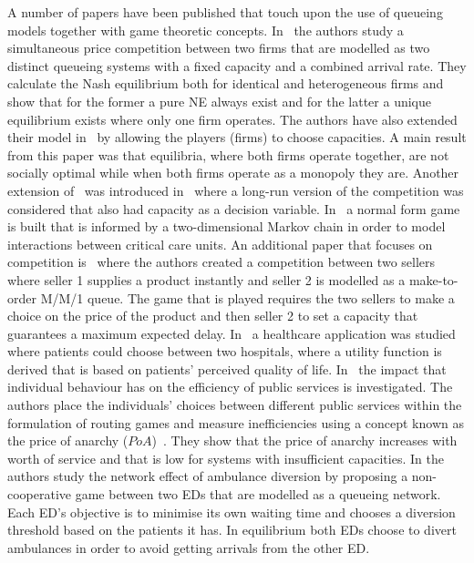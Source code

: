 A number of papers have been published that touch upon the use of 
queueing models together with game theoretic concepts.
In~\cite{FirmCompetition} the authors study a simultaneous price competition 
between two firms that are modelled as two distinct queueing systems with a 
fixed capacity and a combined arrival rate.
They calculate the Nash equilibrium both for identical and heterogeneous firms
and show that for the former a pure NE always exist and for the latter a unique
equilibrium exists where only one firm operates.
The authors have also extended their model in~\cite{FirmCompetition2} by 
allowing the players (firms) to choose capacities. 
A main result from this paper was that equilibria, where both firms operate
together, are not socially optimal while when both firms operate as a monopoly 
they are.
Another extension of~\cite{FirmCompetition} was introduced 
in~\cite{FirmCompetitionExtension} where a long-run version of the competition 
was considered that also had capacity as a decision variable.
In~\cite{knight2017measuring} a normal form game is built that is informed by a 
two-dimensional Markov chain in order to model interactions between critical
care units.
An additional paper that focuses on competition is~\cite{fan2009short} where
the authors created a competition between two sellers where seller 1 supplies 
a product instantly and seller 2 is modelled as a make-to-order M/M/1 queue.
The game that is played requires the two sellers to make a choice on the price 
of the product and then seller 2 to set a capacity that guarantees a maximum 
expected delay.
In~\cite{sadat2015can} a healthcare application was studied where patients 
could choose between two hospitals, where a utility function is derived that is
based on patients' perceived quality of life.
In~\cite{knight2013selfish} the impact that individual behaviour has on the 
efficiency of public services is investigated.
The authors place the individuals' choices between different public services 
within the formulation of routing games and measure inefficiencies using a 
concept known as the price of anarchy (\(PoA\))~\cite{koutsoupias1999worst}.
They show that the price of anarchy increases with worth of service and that is
low for systems with insufficient capacities.
In \cite{deo2011centralized} the authors study the network effect of ambulance 
diversion by proposing a non-cooperative game between two EDs that are modelled
as a queueing network.
Each ED's objective is to minimise its own waiting time and chooses a diversion
threshold based on the patients it has.
In equilibrium both EDs choose to divert ambulances in order to avoid getting
arrivals from the other ED.

